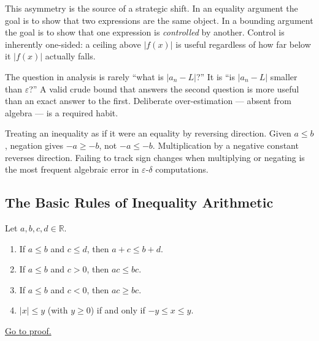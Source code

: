 This asymmetry is the source of a strategic shift. In an equality argument
the goal is to show that two expressions are the same object. In a bounding
argument the goal is to show that one expression is \emph{controlled} by
another. Control is inherently one-sided: a ceiling above $|f(x)|$ is useful
regardless of how far below it $|f(x)|$ actually falls.

\begin{remark}
The question in analysis is rarely ``what is $|a_n-L|$?'' It is ``is
$|a_n-L|$ smaller than $\varepsilon$?'' A valid crude bound that answers the
second question is more useful than an exact answer to the first. Deliberate
over-estimation — absent from algebra — is a required habit.
\end{remark}

\begin{remark}
Treating an inequality as if it were an equality by reversing direction.
Given $a\leq b$, negation gives $-a\geq -b$, not $-a\leq -b$. Multiplication
by a negative constant reverses direction. Failing to track sign changes
when multiplying or negating is the most frequent algebraic error in
$\varepsilon$-$\delta$ computations.
\end{remark}

\subsection*{The Basic Rules of Inequality Arithmetic}
\label{subsec:ineq-rules}

\begin{proposition}
\label{prop:order-arithmetic}
Let $a,b,c,d\in\mathbb{R}$.
\begin{enumerate}[label=(\roman*)]
  \item If $a\leq b$ and $c\leq d$, then $a+c\leq b+d$.
  \item If $a\leq b$ and $c>0$, then $ac\leq bc$.
  \item If $a\leq b$ and $c<0$, then $ac\geq bc$.
  \item $|x|\leq y$ (with $y\geq 0$) if and only if $-y\leq x\leq y$.
\end{enumerate}
\hyperref[prf:order-arithmetic]{Go to proof.}
\end{proposition}

\begin{remark*}
\end{remark*}


